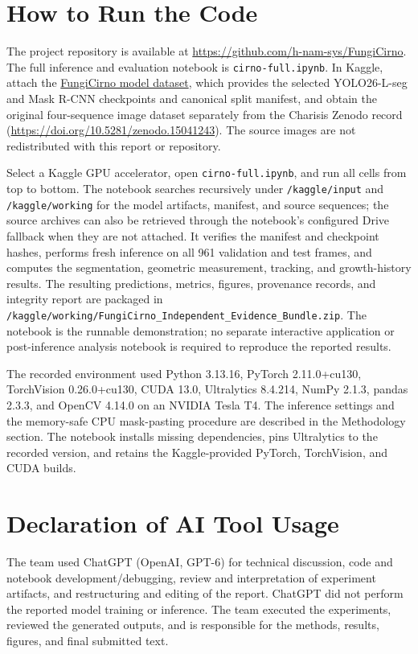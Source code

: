 \documentclass[11pt,a4paper]{article}
\begin{document}
\appendix
\section{How to Run the Code}

The project repository is available at \url{https://github.com/h-nam-sys/FungiCirno}. The full inference and evaluation notebook is \texttt{cirno-full.ipynb}. In Kaggle, attach the \href{https://www.kaggle.com/datasets/hnamedu/fungicirno-models}{FungiCirno model dataset}, which provides the selected YOLO26-L-seg and Mask R-CNN checkpoints and canonical split manifest, and obtain the original four-sequence image dataset separately from the Charisis Zenodo record (\url{https://doi.org/10.5281/zenodo.15041243}). The source images are not redistributed with this report or repository.

Select a Kaggle GPU accelerator, open \texttt{cirno-full.ipynb}, and run all cells from top to bottom. The notebook searches recursively under \texttt{/kaggle/input} and \texttt{/kaggle/working} for the model artifacts, manifest, and source sequences; the source archives can also be retrieved through the notebook's configured Drive fallback when they are not attached. It verifies the manifest and checkpoint hashes, performs fresh inference on all 961 validation and test frames, and computes the segmentation, geometric measurement, tracking, and growth-history results. The resulting predictions, metrics, figures, provenance records, and integrity report are packaged in \texttt{/kaggle/working/FungiCirno\_Independent\_Evidence\_Bundle.zip}. The notebook is the runnable demonstration; no separate interactive application or post-inference analysis notebook is required to reproduce the reported results.

The recorded environment used Python 3.13.16, PyTorch 2.11.0+cu130, TorchVision 0.26.0+cu130, CUDA 13.0, Ultralytics 8.4.214, NumPy 2.1.3, pandas 2.3.3, and OpenCV 4.14.0 on an NVIDIA Tesla T4. The inference settings and the memory-safe CPU mask-pasting procedure are described in the Methodology section. The notebook installs missing dependencies, pins Ultralytics to the recorded version, and retains the Kaggle-provided PyTorch, TorchVision, and CUDA builds.

\section{Declaration of AI Tool Usage}

The team used ChatGPT (OpenAI, GPT-6) for technical discussion, code and notebook development/debugging, review and interpretation of experiment artifacts, and restructuring and editing of the report. ChatGPT did not perform the reported model training or inference. The team executed the experiments, reviewed the generated outputs, and is responsible for the methods, results, figures, and final submitted text.
\end{document}
